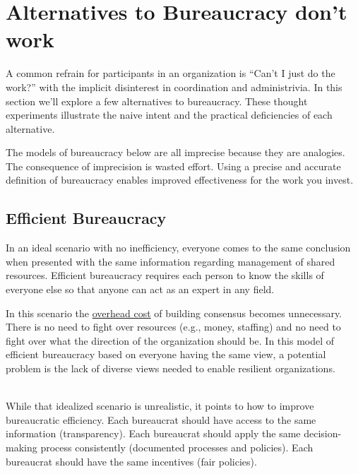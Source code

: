 \section{Alternatives to Bureaucracy don't work\label{sec:alternatives-to-bureaucracy}}
A common refrain for participants in an organization is ``Can't I just do the work?'' with the implicit disinterest in coordination and administrivia. In this section we'll explore a few alternatives to bureaucracy. These thought experiments illustrate the naive intent and the practical deficiencies of each alternative.

The models of bureaucracy below are all imprecise because they are analogies. The consequence of imprecision is wasted effort. Using a precise and accurate definition of bureaucracy enables improved effectiveness for the work you invest.



\subsection*{Efficient Bureaucracy}

In an ideal scenario with no inefficiency, everyone comes to the same conclusion when presented with the same information regarding management of shared resources. Efficient bureaucracy requires each person to know the skills of everyone else so that anyone can act as an expert in any field. 

In this scenario the 
\href{https://en.wikipedia.org/wiki/Overhead_(business)}{overhead cost} 
of building consensus becomes unnecessary. There is no need to fight over resources (e.g., money, staffing) and no need to fight over what the direction of the organization should be. In this model of efficient bureaucracy based on everyone having the same view, a potential problem is the lack of diverse views needed to enable resilient organizations.

\ \\

While that idealized scenario is unrealistic, it points to how to improve bureaucratic efficiency. Each bureaucrat should have access to the same information (transparency). 
Each bureaucrat should apply the same decision-making process consistently (documented processes and policies).
Each bureaucrat should have the same incentives (fair policies).

